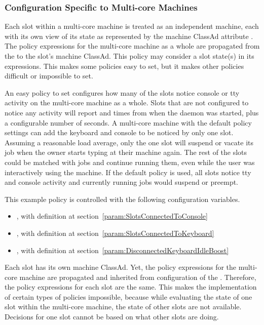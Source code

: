 \subsubsection{\label{sec:Config-SMP-Policy}
Configuration Specific to Multi-core Machines}

Each slot within a multi-core machine is treated as an
independent machine,
each with its own view of its state as represented by the
machine ClassAd attribute .
The policy expressions for the multi-core machine
as a whole are propagated from the 
to the slot's machine ClassAd.
This policy may consider a slot state(s) in its expressions.
This makes some policies easy to set, but it makes
other policies difficult or impossible to set.

An easy policy to set
configures how many of the slots
notice console or tty activity on the multi-core machine as a whole.
Slots that are not configured to notice any activity will report
 and  times from when the
 daemon was started,
plus a configurable number of seconds.
A multi-core machine with the default policy
settings can add the keyboard and console to be noticed by only one slot.
Assuming a reasonable load average,
only the one slot will suspend or vacate its job
when the owner starts typing at their machine again.
The rest of the slots could be matched with jobs and continue running them,
even while the user was interactively using the
machine. 
If the default policy is used,
all slots notice
tty and console activity
and
currently running jobs would suspend or preempt.

This example policy is
controlled with the following configuration variables.
\begin{itemize}
\item {}, with definition at
section~\ref{param:SlotsConnectedToConsole}
\item {}, with definition at
section~\ref{param:SlotsConnectedToKeyboard}
\item {}, with definition at
section~\ref{param:DisconnectedKeyboardIdleBoost}
\end{itemize}

Each slot has its own machine ClassAd.
Yet, the policy expressions for the multi-core machine are
propagated and inherited from configuration of the .
Therefore, the policy expressions for each slot are the same.
This makes the implementation of certain types of policies impossible,
because while evaluating the state of one slot within the multi-core machine,
the state of other slots are not available.
Decisions for one slot cannot be based on what other slots are doing.

